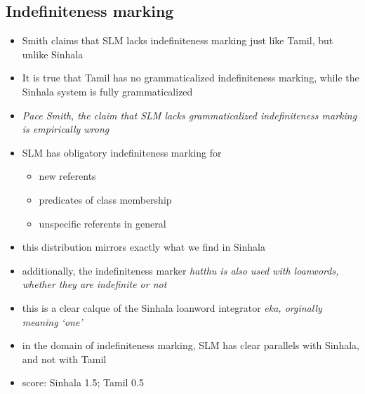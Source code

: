 \documentclass[a4paper,12pt]{article}
\begin{document}
\subsection{Indefiniteness marking}
\begin{itemize}
 \item Smith claims that SLM lacks indefiniteness marking just like Tamil, but unlike Sinhala
 \item It is true that Tamil has no grammaticalized indefiniteness marking, while the Sinhala system is fully grammaticalized
\item \em Pace \em Smith, the claim that SLM lacks grammaticalized indefiniteness marking is empirically wrong
\item SLM has obligatory indefiniteness marking for
\begin{itemize}
 \item new referents
 \item predicates of class membership
 \item unspecific referents in general \citep[319-323]{Nordhoff2009phd}
\end{itemize}




\item this distribution mirrors exactly what we find in Sinhala
 \item additionally, the indefiniteness marker \em hatthu \em is also used with loanwords, whether they are indefinite or not
\item this is a clear calque of the Sinhala loanword integrator \em eka\em, orginally meaning `one'

\let\eachwordtwo=\it
{}
\let\eachwordtwo=\rm

\item in the domain of indefiniteness marking, SLM has clear parallels with Sinhala, and not with Tamil
\item score: Sinhala 1.5; Tamil 0.5
\end{itemize}
\end{document}
